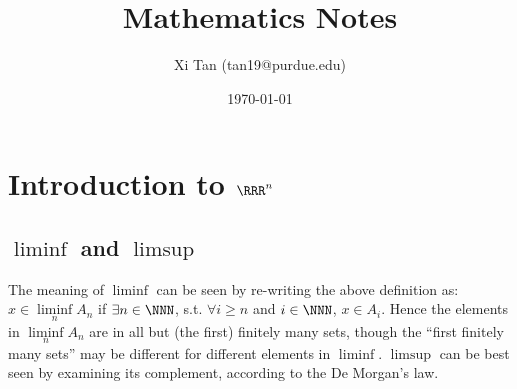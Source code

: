 \documentclass{memoir}
\title{Mathematics Notes}
\author{Xi Tan (tan19@purdue.edu)}
\date{\today}
\begin{document}
\maketitle
\tableofcontents

\chapter{Introduction to $\RRR^n$}
\section{$\liminf$ and $\limsup$}

The meaning of $\liminf$ can be seen by re-writing the above definition as: $x \in \liminf\limits_n A_n$ if $\exists n \in \NNN$, s.t. $\forall i \ge n$ and $i \in \NNN$, $x \in A_i$. Hence the elements in $\liminf\limits_n A_n$ are in all but (the first) finitely many sets, though the ``first finitely many sets'' may be different for different elements in $\liminf$. $\limsup$ can be best seen by examining its complement, according to the De Morgan's law.

\end{document}

